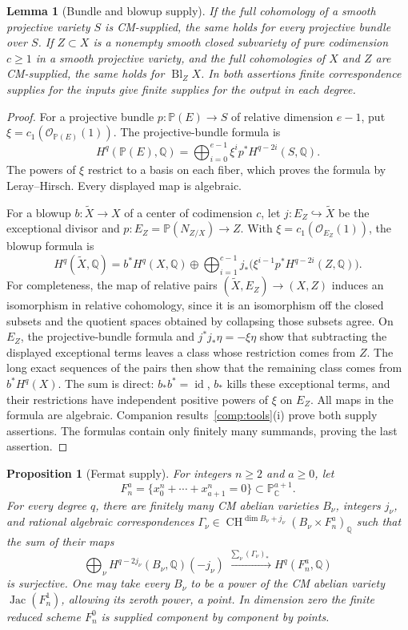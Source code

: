 \documentclass[11pt]{article}
\newcommand{\Q}{\mathbb Q}
\newcommand{\C}{\mathbb C}
\newcommand{\CH}{\operatorname{CH}}
\theoremstyle{plain}
\newtheorem{proposition}[theorem]{Proposition}
\newtheorem{lemma}[theorem]{Lemma}
\theoremstyle{definition}
\theoremstyle{remark}
\numberwithin{equation}{section}
\begin{document}
\begin{lemma}[Bundle and blowup supply]
\label{p4:bundle-blowup-supply}
If the full cohomology of a smooth projective variety $S$ is
CM-supplied, the same holds for every projective bundle over $S$.
If $Z\subset X$ is a nonempty smooth closed subvariety of pure
codimension $c\ge1$ in a smooth projective variety, and the full
cohomologies of $X$ and $Z$ are CM-supplied, the same holds for
$\operatorname{Bl}_Z X$.
In both assertions finite correspondence supplies for the inputs
give finite supplies for the output in each degree.
\end{lemma}

\begin{proof}
For a projective bundle $p:\mathbb P(E)\to S$ of relative
dimension $e-1$, put $\xi=c_1(\mathcal O_{\mathbb P(E)}(1))$.
The projective-bundle formula is
\[
 H^q(\mathbb P(E),\Q)
 =\bigoplus_{i=0}^{e-1}
 \xi^i p^*H^{q-2i}(S,\Q).
\]
The powers of $\xi$ restrict to a basis on each fiber, which proves
the formula by Leray--Hirsch.  Every displayed map is algebraic.

For a blowup $b:\widetilde X\to X$ of a center of codimension
$c$, let $j:E_Z\hookrightarrow\widetilde X$ be the exceptional
divisor and $p:E_Z=\mathbb P(N_{Z/X})\to Z$.  With
$\xi=c_1(\mathcal O_{E_Z}(1))$, the blowup formula is
\[
 H^q(\widetilde X,\Q)=b^*H^q(X,\Q)
 \oplus\bigoplus_{i=1}^{c-1}
 j_*\bigl(\xi^{i-1}p^*H^{q-2i}(Z,\Q)\bigr).
\]
For completeness, the map of relative pairs
$(\widetilde X,E_Z)\to(X,Z)$ induces an isomorphism in relative
cohomology, since it is an isomorphism off the closed subsets and
the quotient spaces obtained by collapsing those subsets agree.
On $E_Z$, the projective-bundle formula and
$j^*j_*\eta=-\xi\eta$ show that subtracting the displayed
exceptional terms leaves a class whose restriction comes from
$Z$.  The long exact sequences of the pairs then show that the
remaining class comes from $b^*H^q(X)$.  The sum is direct:
$b_*b^*=\operatorname{id}$, $b_*$ kills these exceptional
terms, and their restrictions have independent positive powers
of $\xi$ on $E_Z$.  All maps in the formula are algebraic.
Companion results~\ref{comp:tools}\textup{(i)} prove both supply assertions.
The formulas contain only finitely many summands, proving the
last assertion.
\end{proof}

\begin{proposition}[Fermat supply]
\label{p4:fermat-supply}
For integers $n\ge2$ and $a\ge0$, let
\[
 F_n^a=\{x_0^n+\cdots+x_{a+1}^n=0\}
       \subset\mathbb P^{a+1}_\C.
\]
For every degree $q$, there are finitely many CM abelian varieties
$B_\nu$, integers $j_\nu$, and rational algebraic correspondences
$\Gamma_\nu\in\CH^{\dim B_\nu+j_\nu}(B_\nu\times F_n^a)_\Q$
such that the sum of their maps
\[
 \bigoplus_\nu H^{q-2j_\nu}(B_\nu,\Q)(-j_\nu)
 \xrightarrow{\;\sum_\nu(\Gamma_\nu)_*\;}
 H^q(F_n^a,\Q)
\]
is surjective.  One may take every $B_\nu$ to be a power of the
CM abelian variety $\operatorname{Jac}(F_n^1)$, allowing its
zeroth power, a point.  In dimension zero the finite reduced
scheme $F_n^0$ is supplied component by component by points.
\end{proposition}
\end{document}
